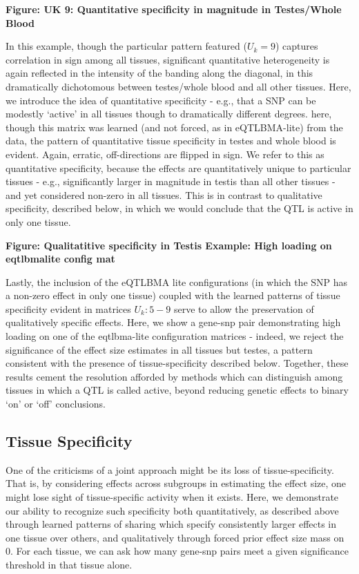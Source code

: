\textbf{Figure: UK 9: Quantitative specificity in magnitude in Testes/Whole Blood}
\newline

In this example, though the particular pattern featured ($U_{k}=9$) captures correlation in sign among all tissues, significant quantitative heterogeneity is again reflected in the intensity of the banding along the diagonal, in this dramatically dichotomous between testes/whole blood and all other tissues. Here, we introduce the idea of quantitative specificity - e.g., that a SNP can be modestly `active' in all tissues though to dramatically different degrees. here, though this matrix was learned (and not forced, as in eQTLBMA-lite) from the data, the pattern of quantitative tissue specificity in testes and whole blood is evident. Again, erratic, off-directions are flipped in sign. We refer to this as quantitative specificity, because the effects are quantitatively unique to particular tissues - e.g., significantly larger in magnitude in testis than all other tissues - and yet considered non-zero in all tissues. This is in contrast to qualitative specificity, described below, in which we would conclude that the QTL is active in only one tissue. \newline



\textbf{Figure: Qualitatitive specificity in Testis Example: High loading on eqtlbmalite config mat}
\newline

Lastly, the inclusion of the eQTLBMA lite configurations (in which the SNP has a non-zero effect in only one tissue) coupled with the learned patterns of tissue specificity evident in matrices $U_{k}: 5-9$ serve to allow the preservation of qualitatively specific effects. Here, we show a gene-snp pair demonstrating high loading on one of the eqtlbma-lite configuration matrices - indeed, we reject the significance of the effect size estimates in all tissues but testes, a pattern consistent with the presence of tissue-specificity described below. Together, these results cement the resolution afforded by methods which can distinguish among tissues in which a QTL is called active, beyond reducing genetic effects to binary `on' or `off' conclusions.


\subsection{Tissue Specificity}

One of the criticisms of a joint approach might be its loss of tissue-specificity. That is, by considering effects across subgroups in estimating the effect size, one might lose sight of tissue-specific activity when it exists. Here, we demonstrate our ability to recognize such specificity both quantitatively, as described above through learned patterns of sharing which specify consistently larger effects in one tissue over others, and qualitatively through forced prior effect size mass on 0.  For each tissue, we can ask how many gene-snp pairs meet a given significance threshold in that tissue alone.\newline


